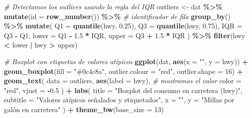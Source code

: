 \documentclass[
]{book}
\newenvironment{Shaded}{\begin{snugshade}}{\end{snugshade}}
\newcommand{\AttributeTok}[1]{\textcolor[rgb]{0.13,0.29,0.53}{#1}}
\newcommand{\CommentTok}[1]{\textcolor[rgb]{0.56,0.35,0.01}{\textit{#1}}}
\newcommand{\DecValTok}[1]{\textcolor[rgb]{0.00,0.00,0.81}{#1}}
\newcommand{\FloatTok}[1]{\textcolor[rgb]{0.00,0.00,0.81}{#1}}
\newcommand{\FunctionTok}[1]{\textcolor[rgb]{0.13,0.29,0.53}{\textbf{#1}}}
\newcommand{\NormalTok}[1]{#1}
\newcommand{\OtherTok}[1]{\textcolor[rgb]{0.56,0.35,0.01}{#1}}
\newcommand{\SpecialCharTok}[1]{\textcolor[rgb]{0.81,0.36,0.00}{\textbf{#1}}}
\newcommand{\StringTok}[1]{\textcolor[rgb]{0.31,0.60,0.02}{#1}}
\begin{document}
\begin{Shaded}
\begin{Highlighting}[]
\CommentTok{\# Detectamos los outliers usando la regla del IQR}
\NormalTok{outliers }\OtherTok{\textless{}{-}}\NormalTok{ dat }\SpecialCharTok{\%\textgreater{}\%}
  \FunctionTok{mutate}\NormalTok{(}\AttributeTok{id =} \FunctionTok{row\_number}\NormalTok{()) }\SpecialCharTok{\%\textgreater{}\%}   \CommentTok{\# identificador de fila}
  \FunctionTok{group\_by}\NormalTok{() }\SpecialCharTok{\%\textgreater{}\%}
  \FunctionTok{mutate}\NormalTok{(}
    \AttributeTok{Q1 =} \FunctionTok{quantile}\NormalTok{(hwy, }\FloatTok{0.25}\NormalTok{),}
    \AttributeTok{Q3 =} \FunctionTok{quantile}\NormalTok{(hwy, }\FloatTok{0.75}\NormalTok{),}
    \AttributeTok{IQR =}\NormalTok{ Q3 }\SpecialCharTok{{-}}\NormalTok{ Q1,}
    \AttributeTok{lower =}\NormalTok{ Q1 }\SpecialCharTok{{-}} \FloatTok{1.5} \SpecialCharTok{*}\NormalTok{ IQR,}
    \AttributeTok{upper =}\NormalTok{ Q3 }\SpecialCharTok{+} \FloatTok{1.5} \SpecialCharTok{*}\NormalTok{ IQR}
\NormalTok{  ) }\SpecialCharTok{\%\textgreater{}\%}
  \FunctionTok{filter}\NormalTok{(hwy }\SpecialCharTok{\textless{}}\NormalTok{ lower }\SpecialCharTok{|}\NormalTok{ hwy }\SpecialCharTok{\textgreater{}}\NormalTok{ upper)}

\CommentTok{\# Boxplot con etiquetas de valores atípicos}
\FunctionTok{ggplot}\NormalTok{(dat, }\FunctionTok{aes}\NormalTok{(}\AttributeTok{x =} \StringTok{""}\NormalTok{, }\AttributeTok{y =}\NormalTok{ hwy)) }\SpecialCharTok{+}
  \FunctionTok{geom\_boxplot}\NormalTok{(}\AttributeTok{fill =} \StringTok{"\#0c4c8a"}\NormalTok{, }\AttributeTok{outlier.colour =} \StringTok{"red"}\NormalTok{, }\AttributeTok{outlier.shape =} \DecValTok{16}\NormalTok{) }\SpecialCharTok{+}
  \FunctionTok{geom\_text}\NormalTok{(}
    \AttributeTok{data =}\NormalTok{ outliers,}
    \FunctionTok{aes}\NormalTok{(}\AttributeTok{label =}\NormalTok{ hwy),    }\CommentTok{\# mostramos el valor}
    \AttributeTok{color =} \StringTok{"red"}\NormalTok{,}
    \AttributeTok{vjust =} \SpecialCharTok{{-}}\FloatTok{0.5}
\NormalTok{  ) }\SpecialCharTok{+}
  \FunctionTok{labs}\NormalTok{(}
    \AttributeTok{title =} \StringTok{"Boxplot del consumo en carretera (hwy)"}\NormalTok{,}
    \AttributeTok{subtitle =} \StringTok{"Valores atípicos señalados y etiquetados"}\NormalTok{,}
    \AttributeTok{x =} \StringTok{""}\NormalTok{,}
    \AttributeTok{y =} \StringTok{"Millas por galón en carretera"}
\NormalTok{  ) }\SpecialCharTok{+}
  \FunctionTok{theme\_bw}\NormalTok{(}\AttributeTok{base\_size =} \DecValTok{13}\NormalTok{)}
\end{Highlighting}
\end{Shaded}
\end{document}
